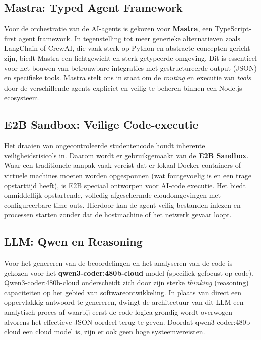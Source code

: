 \subsection{Mastra: Typed Agent Framework}
Voor de orchestratie van de AI-agents is gekozen voor \textbf{Mastra}, een TypeScript-first agent framework. In tegenstelling tot meer generieke alternatieven zoals LangChain of CrewAI, die vaak sterk op Python en abstracte concepten gericht zijn, biedt Mastra een lichtgewicht en sterk getypeerde omgeving. Dit is essentieel voor het bouwen van betrouwbare integraties met gestructureerde output (JSON) en specifieke tools. Mastra stelt ons in staat om de \textit{routing} en executie van \textit{tools} door de verschillende agents expliciet en veilig te beheren binnen een Node.js ecosysteem.

\vspace{1em}

\subsection{E2B Sandbox: Veilige Code-executie}
Het draaien van ongecontroleerde studentencode houdt inherente veiligheidsrisico's in. Daarom wordt er gebruikgemaakt van de \textbf{E2B Sandbox}. Waar een traditionele aanpak vaak vereist dat er lokaal Docker-containers of virtuele machines moeten worden opgesponnen (wat foutgevoelig is en een trage opstarttijd heeft), is E2B speciaal ontworpen voor AI-code executie. Het biedt onmiddellijk opstartende, volledig afgeschermde cloudomgevingen met configureerbare time-outs. Hierdoor kan de agent veilig bestanden inlezen en processen starten zonder dat de hostmachine of het netwerk gevaar loopt.

\vspace{1em}

\subsection{LLM: Qwen en Reasoning}
Voor het genereren van de beoordelingen en het analyseren van de code is gekozen voor het \textbf{qwen3-coder:480b-cloud} model (specifiek gefocust op code). Qwen3-coder:480b-cloud onderscheidt zich door zijn sterke \textit{thinking} (reasoning) capaciteiten op het gebied van softwareontwikkeling. In plaats van direct een oppervlakkig antwoord te genereren, dwingt de architectuur van dit LLM een analytisch proces af waarbij eerst de code-logica grondig wordt overwogen alvorens het effectieve JSON-oordeel terug te geven. Doordat qwen3-coder:480b-cloud een cloud model is, zijn er ook geen hoge systeemvereisten.

